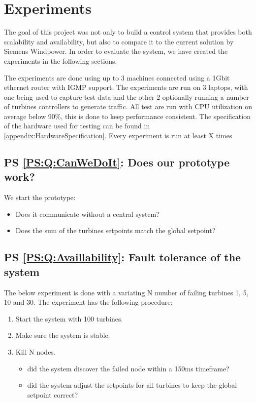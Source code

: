 
\chapter{Experiments}

\newcommand{\failingTurbineNumbers}{1, 5, 10 and 30}
\newcommand{\testTurbineNumbers}{2, 21, 41, 61, 81 and 101}
\newcommand{\experiemntRunTime}{2mins}


The goal of this project was not only to build a control system that provides both scalability and availability, but also to compare it to the current solution by Siemens Windpower. 
In order to evaluate the system, we have created the experiments in the following sections.

The experiments are done using up to 3 machines connected using a 1Gbit ethernet router with IGMP support.
The experiments are run on 3 laptops, with one being used to capture test data and the other 2 optionally running a number of turbines controllers to generate traffic.
All test are run with CPU utilization on average below 90\%, this is done to keep performance consistent.
The specification of the hardware used for testing can be found in \cref{appendix:HardwareSpecification}.
Every experiment is run at least X times 

\section{PS \ref{PS:Q:CanWeDoIt}: Does our prototype work?}
We start the prototype:
\begin{itemize}
	\item Does it communicate without a central system?
	\item Does the sum of the turbines setpoints match the global setpoint? 
\end{itemize}

\section{PS \ref{PS:Q:Availlability}: Fault tolerance of the system}

The below experiment is done with a variating N number of failing turbines \failingTurbineNumbers.
The experiment has the following procedure:
\begin{enumerate}
	\item Start the system with 100 turbines.
	\item Make sure the system is stable.
	\item Kill N nodes.
	\begin{itemize}
		\item did the system discover the failed node within a 150ms timeframe?
		\item did the system adjust the setpoints for all turbines to keep the global setpoint correct?
	\end{itemize}
\end{enumerate}


